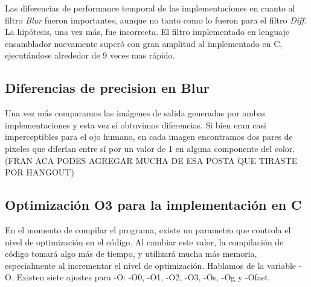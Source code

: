 \documentclass[10pt,a4paper,spanish]{article}
\begin{document}
Las diferencias de performance temporal de las implementaciones en cuanto al filtro \textit{Blur} fueron importantes, aunque no tanto como lo fueron para el filtro \textit{Diff}. La hipótesis, una vez más, fue incorrecta. El filtro implementado en lenguaje ensamblador nuevamente superó con gran amplitud al implementado en C, ejecutándose alrededor de 9 veces mas rápido. \\


\subsection{Diferencias de precision en Blur}

Una vez más comparamos las imágenes de salida generadas por ambas implementaciones y esta vez sí obtuvimos diferencias. Si bien eran casi imperceptibles para el ojo humano, en cada imagen encontramos dos pares de pixeles que diferían entre sí por un valor de 1 en alguna componente del color. (FRAN ACA PODES AGREGAR MUCHA DE ESA POSTA QUE TIRASTE POR HANGOUT)

\subsection{Optimización O3 para la implementación en C}

En el momento de compilar el programa, existe un parametro que controla el nivel de optimización en el código. Al cambiar este valor, la compilación de código tomará algo más de tiempo, y utilizará mucha más memoria, especialmente al incrementar el nivel de optimización. Hablamos de la variable -O. Existen siete ajustes para -O: -O0, -O1, -O2, -O3, -Os, -Og y -Ofast. \\
\end{document}
